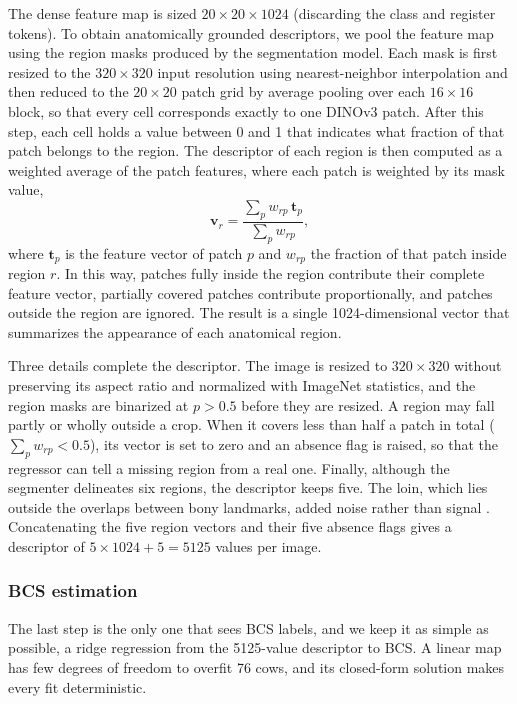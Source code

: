 The dense feature map is sized $20\times20\times1024$ (discarding the class and register tokens).
To obtain anatomically grounded descriptors, we pool the feature map using the region masks produced by the segmentation model.
Each mask is first resized to the $320\times320$ input resolution using nearest-neighbor interpolation and then reduced to the $20\times20$ patch grid by average pooling over each $16\times16$ block, so that every cell corresponds exactly to one DINOv3 patch.
After this step, each cell holds a value between 0 and 1 that indicates what fraction of that patch belongs to the region.
The descriptor of each region is then computed as a weighted average of the patch features, where each patch is weighted by its mask value,
\begin{equation}
  \mathbf{v}_r = \frac{\sum_p w_{rp}\, \mathbf{t}_p}{\sum_p w_{rp}} ,
  \label{eq:pool}
\end{equation}
where $\mathbf{t}_p$ is the feature vector of patch $p$ and $w_{rp}$ the fraction of that patch inside region $r$.
In this way, patches fully inside the region contribute their complete feature vector, partially covered patches contribute proportionally, and patches outside the region are ignored.
The result is a single 1024-dimensional vector that summarizes the appearance of each anatomical region.

Three details complete the descriptor.
The image is resized to $320\times320$ without preserving its aspect ratio and normalized with ImageNet statistics, and the region masks are binarized at $p > 0.5$ before they are resized.
A region may fall partly or wholly outside a crop. When it covers less than half a patch in total ($\sum_p w_{rp} < 0.5$), its vector is set to zero and an absence flag is raised, so that the regressor can tell a missing region from a real one.
Finally, although the segmenter delineates six regions, the descriptor keeps five. The loin, which lies outside the overlaps between bony landmarks, added noise rather than signal .
Concatenating the five region vectors and their five absence flags gives a descriptor of $5\times1024 + 5 = 5125$ values per image.

\subsubsection{BCS estimation}
\label{sec:ridge}

The last step is the only one that sees BCS labels, and we keep it as simple as possible, a ridge regression from the 5125-value descriptor to BCS.
A linear map has few degrees of freedom to overfit 76 cows, and its closed-form solution makes every fit deterministic.

